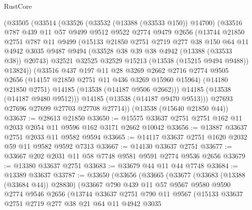 \begin{lexlean}{RustCore}
\begin{coremodule}
    (@33505
      (@33514
        (@33526
          (@33532 (@13388 (@33533 @150)) @14700)
          (@33516
            @787
            @439
            @11
            @57
            @9499
            @9512
            @9522
            @2774
            @9479
            @2656
            (@13744
              @21850
              @2751
              @787
              @11
              @9499
              (@15133
                @21850
                @2751
                @2719
                @277
                @38
                @150
                @64
                @11
                @4942
                @3035
                @9487
                @9494
                (@33528 @38 @39 @38 @4942 (@13388 (@33533 @38)) @20743)
                @32521
                @32525
                @32529
                @15213
                (@13538 (@15215 @9494 @9488))
                @13824))
            (@33516
              @437
              @197
              @11
              @28
              @3269
              @2662
              @2716
              @2774
              @9505
              @2656
              (@14157 @21850 @2751 @11 @436 @3269 @15960 @15964)
              (@14180 @21850 @2751)
              @14185
              (@13538 (@14187 @9506 @2662)))
            @14185
            (@13538 (@14187 @9480 @9512)))
          @14185
          (@13538 (@14187 @9470 @9513)))
        @27693
        @27696
        @27699
        @27703
        @27708
        @27714))
    (@13538 (@15640 @21850 @44))
@33637 := @28613 @21850
@33650 := @15575 @33637 @2751 @2751 @162 @11 @2033 @2054 @11 @9596 @162 @3171 @2662 @10042
@33656 := @13887 @33637 @2751 @2033 @11 @9582 @9594
@33665 := @14117 @33637 @2751 @1620 @2032 @59 @11 @9582 @9592 @7313
@33667 := @14130 @33637 @2751
@33677 := @33667 @202 @2031 @11 @58 @7748 @9581 @9591 @2774 @9536 @2656
@33679 := @13380 @33637 @2751
@33683 := @33679 @44 @11 @44 @7748
@33684 := @13389 @33637
@33787 := @33650
    (@33656
      (@33665
        (@33677
          (@33683 (@13388 (@33684 @44)) @28830)
          (@33667
            @790
            @439
            @11
            @57
            @9567
            @9580
            @9590
            @2774
            @9546
            @2656
            (@13744
              @33637
              @2751
              @790
              @11
              @9567
              (@15133
                @33637
                @2751
                @2719
                @277
                @38
                @21
                @64
                @11
                @4942
                @3035

\end{coremodule}
\end{lexlean}
